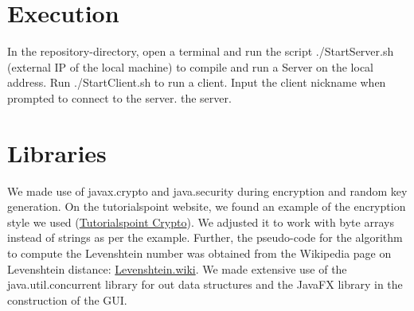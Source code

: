 \documentclass[12pt, a4paper]{article}
\begin{document}
\section{Execution}
In the repository-directory, open a terminal and run the script ./StartServer.sh (external IP of the local machine) to compile and run a Server on the local address. Run ./StartClient.sh to run a client. Input the client nickname when prompted to connect to the server. the server.

\section{Libraries}
We made use of javax.crypto and java.security during encryption and random key generation. On the tutorialspoint website, we found an example of the encryption style we used (\href{https://www.tutorialspoint.com/java_cryptography/java_cryptography_encrypting_data.htm}{Tutorialspoint Crypto}). We adjusted it to work with byte arrays instead of strings as per the example. Further, the pseudo-code for the algorithm to compute the Levenshtein number was obtained from the Wikipedia page on Levenshtein distance: \href{https://en.wikipedia.org/wiki/Levenshtein_distance}{Levenshtein.wiki}.
We made extensive use of the java.util.concurrent library for out data structures and the JavaFX library in the construction of the GUI.
\end{document}
